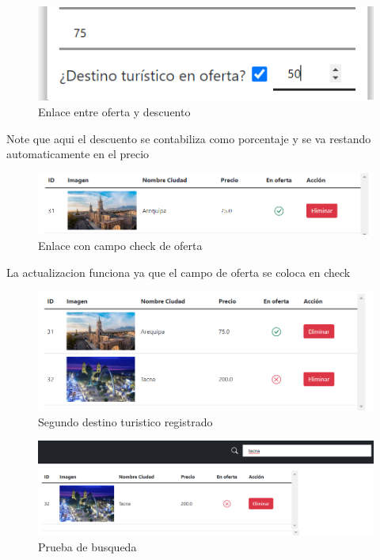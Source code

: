 \documentclass{article}
\begin{document}
        \begin{figure}
            \centering
            \includegraphics[width=150mm]{img/img6.png}
            \caption{Enlace entre oferta y descuento}
            \label{fig:enter-label}
        \end{figure}
        Note que aqui el descuento se contabiliza como porcentaje y se va restando automaticamente en el precio
        \begin{figure}
            \centering
            \includegraphics[width=150mm]{img/img7.png}
            \caption{Enlace con campo check de oferta}
            \label{fig:enter-label}
        \end{figure}
        
        La actualizacion funciona ya que el campo de oferta se coloca en check
        
        \begin{figure}
            \centering
            \includegraphics[width=150mm]{img/img8.png}
            \caption{Segundo destino turistico registrado}
            \label{fig:enter-label}
        \end{figure}
        
        \begin{figure}
            \centering
            \includegraphics[width=150mm]{img/img9.png}
            \caption{Prueba de busqueda}
            \label{fig:enter-label}
        \end{figure}
        
\end{document}
